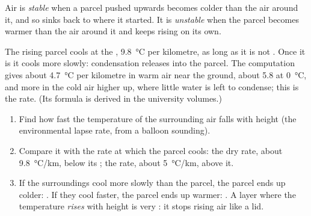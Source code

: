 \begin{definition}\label{def:g10:why-clouds-form:stability}
Air is \emph{stable} when a parcel pushed upwards becomes
colder than the air around it, and so sinks back to where it started. It is
\emph{unstable} when the parcel becomes warmer than the
air around it and keeps rising on its own.
\end{definition}

The rising parcel cools at the , \qty{9.8}{\degreeCelsius}
per kilometre, as long as it is not . Once it is  it cools
more slowly: condensation releases  into the parcel. The
computation gives about \qty{4.7}{\degreeCelsius} per kilometre in warm air
near the ground, about \num{5.8} at \qty{0}{\degreeCelsius}, and more in the
cold air higher up, where little water is left to condense; this is the
 rate. (Its formula is derived in the university volumes.)

\begin{method}\label{met:g10:why-clouds-form:stable}
\begin{enumerate}
  \item Find how fast the temperature of the surrounding air falls with
        height (the environmental lapse rate, from a balloon sounding).
  \item Compare it with the rate at which the parcel cools: the dry rate,
        about \qty{9.8}{\degreeCelsius/km}, below its ;
        the  rate, about \qty{5}{\degreeCelsius/km}, above it.
  \item If the surroundings cool more slowly than the parcel, the parcel
        ends up colder: . If they cool faster, the parcel ends up
        warmer: . A layer where the temperature \emph{rises} with
        height is very : it stops rising air like a lid.
\end{enumerate}
\end{method}

